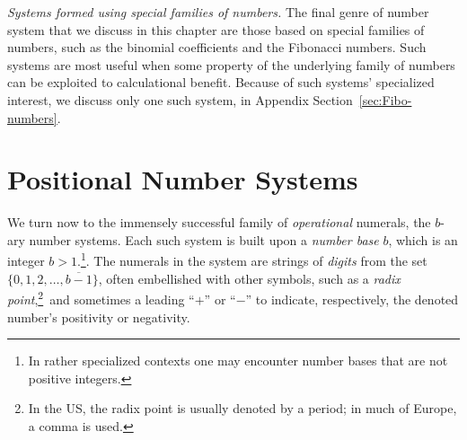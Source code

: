 \medskip


\noindent
{\it Systems formed using special families of numbers.}
The final genre of number system that we discuss in this chapter are those based on special families of numbers, such as the binomial coefficients and the Fibonacci numbers.  Such systems are most useful when some property of the underlying family of numbers can be exploited to calculational benefit.  Because of such systems' specialized interest, we discuss only one such system, in Appendix Section~\ref{sec:Fibo-numbers}.   


\section{Positional Number Systems}
\label{sec:positional-numbers}

We turn now to the immensely successful family of {\em operational} numerals, the $b$-ary number systems.  Each such system is built upon a {\em number base} $b$, which is an integer $b> 1$.\footnote{In rather specialized contexts one may encounter number bases that are not positive integers.}.  The numerals in the system are strings of {\it digits} from the set
$\{0, 1, 2, \ldots, \overline{b-1}\}$, often embellished with other symbols, such as a {\em radix point},\footnote{In the US, the radix point is usually denoted by a period; in much of Europe, a comma is used.}~and sometimes a leading ``$+$'' or ``$-$'' to indicate, respectively, the denoted number's positivity or negativity.

\medskip


\noindent {}

\medskip

